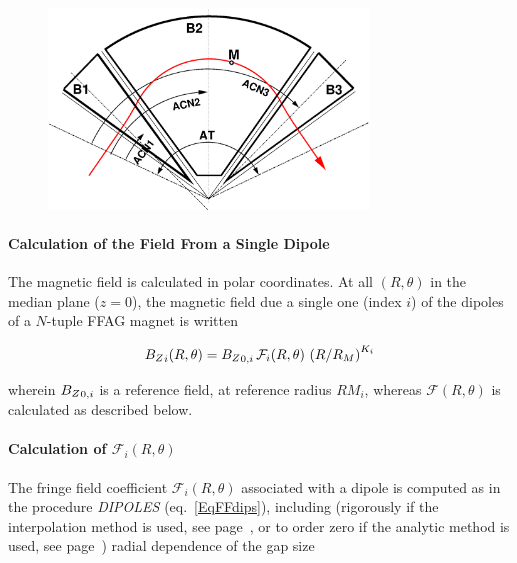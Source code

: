 \begin{figure}[h]
 \begin{center}
\includegraphics[width=8.5cm]{ffagTriplet.eps}  
{\setlength{\captionwidth}{12cm}
 }
  \end{center}
\end{figure}


\paragraph{Calculation of the Field From a Single Dipole} 

 \noindent The magnetic field is calculated in  polar
coordinates.  At all $(R,\theta)$ in the median plane ($z=0$), the 
magnetic field  due  a single one (index $i$) of the  dipoles  of a $N$-tuple FFAG  magnet is written 

$$ {B_Z}_i(R,\theta) =  {B_Z}_{0,i} \, \mathcal{F}_i(R,\theta) \, \left(   R/R_M \right)^{K_i}  $$

\noindent wherein ${B_Z}_{0,i}$  is a reference field, at reference radius  $RM_{i}$, 
 whereas $ \mathcal{F}(R,\theta)$ is calculated as described below. 



\paragraph{Calculation of $\mathcal{F}_i(R,\theta) $} 

\noindent The fringe field coefficient  $\mathcal{F}_i(R,\theta) $ associated with a  dipole is computed as in the 
procedure  \textsl{DIPOLES} (eq.~\ref{EqFFdips}), including (rigorously if the interpolation method is 
used, see page~\pageref{AnalMeth}, or to  order zero if the analytic method is used, see page~\pageref{InterpMeth}) 
 radial dependence of the gap size 

